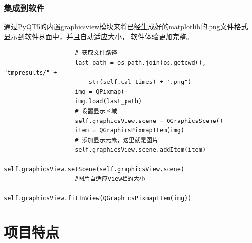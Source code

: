 \documentclass[UTF8]{ctexart}
\begin{document}
            \subsubsection{集成到软件}
            通过PyQT5的内置graphicsview模块来将已经生成好的matplotlib的.png文件格式显示到软件界面中，并且自动适应大小，
            软件体验更加完整。
                \begin{lstlisting}
                    # 获取文件路径
                    last_path = os.path.join(os.getcwd(), "tmpresults/" + 
                        str(self.cal_times) + ".png")
                    img = QPixmap()
                    img.load(last_path)
                    # 设置显示区域
                    self.graphicsView.scene = QGraphicsScene()
                    item = QGraphicsPixmapItem(img)
                    # 添加显示元素，这里就是图片
                    self.graphicsView.scene.addItem(item)
                    self.graphicsView.setScene(self.graphicsView.scene)
                    #图片自适应view栏的大小
                    self.graphicsView.fitInView(QGraphicsPixmapItem(img))
                \end{lstlisting}
    \section{项目特点}
\end{document}
